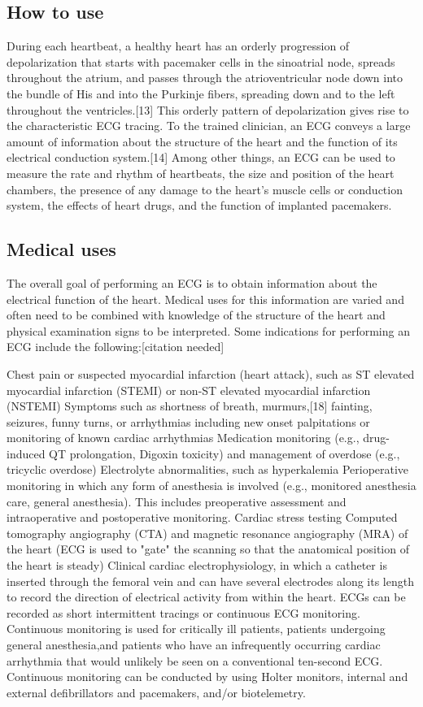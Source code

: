\documentclass[12pt]{article}
\begin{document}
\subsection{How to use}
During each heartbeat, a healthy heart has an orderly progression of depolarization that starts with pacemaker cells in the sinoatrial node, spreads throughout the atrium, and passes through the atrioventricular node down into the bundle of His and into the Purkinje fibers, spreading down and to the left throughout the ventricles.[13] This orderly pattern of depolarization gives rise to the characteristic ECG tracing. To the trained clinician, an ECG conveys a large amount of information about the structure of the heart and the function of its electrical conduction system.[14] Among other things, an ECG can be used to measure the rate and rhythm of heartbeats, the size and position of the heart chambers, the presence of any damage to the heart's muscle cells or conduction system, the effects of heart drugs, and the function of implanted pacemakers.
\subsection{Medical uses}
The overall goal of performing an ECG is to obtain information about the electrical function of the heart. Medical uses for this information are varied and often need to be combined with knowledge of the structure of the heart and physical examination signs to be interpreted. Some indications for performing an ECG include the following:[citation needed]

Chest pain or suspected myocardial infarction (heart attack), such as ST elevated myocardial infarction (STEMI) or non-ST elevated myocardial infarction (NSTEMI)
Symptoms such as shortness of breath, murmurs,[18] fainting, seizures, funny turns, or arrhythmias including new onset palpitations or monitoring of known cardiac arrhythmias
Medication monitoring (e.g., drug-induced QT prolongation, Digoxin toxicity) and management of overdose (e.g., tricyclic overdose)
Electrolyte abnormalities, such as hyperkalemia
Perioperative monitoring in which any form of anesthesia is involved (e.g., monitored anesthesia care, general anesthesia). This includes preoperative assessment and intraoperative and postoperative monitoring.
Cardiac stress testing
Computed tomography angiography (CTA) and magnetic resonance angiography (MRA) of the heart (ECG is used to "gate" the scanning so that the anatomical position of the heart is steady)
Clinical cardiac electrophysiology, in which a catheter is inserted through the femoral vein and can have several electrodes along its length to record the direction of electrical activity from within the heart.
ECGs can be recorded as short intermittent tracings or continuous ECG monitoring. Continuous monitoring is used for critically ill patients, patients undergoing general anesthesia,and patients who have an infrequently occurring cardiac arrhythmia that would unlikely be seen on a conventional ten-second ECG. Continuous monitoring can be conducted by using Holter monitors, internal and external defibrillators and pacemakers, and/or biotelemetry.
\end{document}
